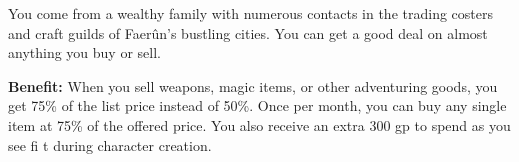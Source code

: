 
You come from a wealthy family with numerous contacts in the trading costers and craft guilds of Faerûn’s bustling cities. You can get a good deal on almost anything you buy or sell.

\textbf{Benefit:} When you sell weapons, magic items, or other adventuring goods, you get 75\% of the list price instead of 50\%. Once per month, you can buy any single item at 75\% of the offered price. You also receive an extra 300 gp to spend as you see fi t during character creation.
